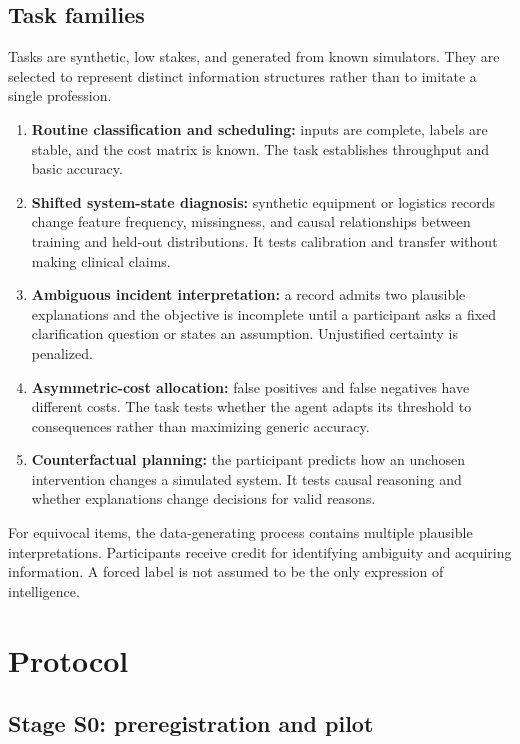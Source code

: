 \documentclass[conference]{IEEEtran}
\begin{document}
\subsection{Task families}

Tasks are synthetic, low stakes, and generated from known simulators. They are selected to represent distinct information structures rather than to imitate a single profession.

\begin{enumerate}
\item \textbf{Routine classification and scheduling:} inputs are complete, labels are stable, and the cost matrix is known. The task establishes throughput and basic accuracy.
\item \textbf{Shifted system-state diagnosis:} synthetic equipment or logistics records change feature frequency, missingness, and causal relationships between training and held-out distributions. It tests calibration and transfer without making clinical claims.
\item \textbf{Ambiguous incident interpretation:} a record admits two plausible explanations and the objective is incomplete until a participant asks a fixed clarification question or states an assumption. Unjustified certainty is penalized.
\item \textbf{Asymmetric-cost allocation:} false positives and false negatives have different costs. The task tests whether the agent adapts its threshold to consequences rather than maximizing generic accuracy.
\item \textbf{Counterfactual planning:} the participant predicts how an unchosen intervention changes a simulated system. It tests causal reasoning and whether explanations change decisions for valid reasons.
\end{enumerate}

For equivocal items, the data-generating process contains multiple plausible interpretations. Participants receive credit for identifying ambiguity and acquiring information. A forced label is not assumed to be the only expression of intelligence.

\section{Protocol}

\subsection{Stage S0: preregistration and pilot}
\end{document}
